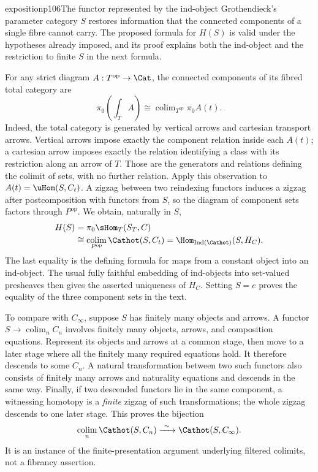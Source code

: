 \begin{dcomment}{exposition}{p106}{The functor represented by the ind-object}
Grothendieck's parameter category $S$ restores information that the connected components of a single fibre cannot carry. The proposed formula for $H(S)$ is valid under the hypotheses already imposed, and its proof explains both the ind-object and the restriction to finite $S$ in the next formula.

For any strict diagram $A:T^{\mathrm{op}}\to\Cat$, the connected components of its fibred total category are
\[
 \pi_0\left(\int_T A\right)
 \cong\mathop{\mathrm{colim}}_{T^{\mathrm{op}}}\pi_0 A(t).
\]
Indeed, the total category is generated by vertical arrows and cartesian transport arrows. Vertical arrows impose exactly the component relation inside each $A(t)$; a cartesian arrow imposes exactly the relation identifying a class with its restriction along an arrow of $T$. Those are the generators and relations defining the colimit of sets, with no further relation. Apply this observation to $A(t)=\uHom(S,C_t)$. A zigzag between two reindexing functors induces a zigzag after postcomposition with functors from $S$, so the diagram of component sets factors through $P^{\mathrm{op}}$. We obtain, naturally in $S$,
\[
 \begin{split}
 H(S)&=\pi_0\sHom_T(S_T,C)\\
 &\cong\mathop{\mathrm{colim}}_{P^{\mathrm{op}}}
       \Cathot(S,C_t)
 =\Hom_{\operatorname{Ind}(\Cathot)}(S,H_C).
 \end{split}
\]
The last equality is the defining formula for maps from a constant object into an ind-object. The usual fully faithful embedding of ind-objects into set-valued presheaves then gives the asserted uniqueness of $H_C$. Setting $S=e$ proves the equality of the three component sets in the text.

To compare with $C_\infty$, suppose $S$ has finitely many objects and arrows. A functor $S\to\mathop{\mathrm{colim}}_n C_n$ involves finitely many objects, arrows, and composition equations. Represent its objects and arrows at a common stage, then move to a later stage where all the finitely many required equations hold. It therefore descends to some $C_n$. A natural transformation between two such functors also consists of finitely many arrows and naturality equations and descends in the same way. Finally, if two descended functors lie in the same component, a witnessing homotopy is a \emph{finite} zigzag of such transformations; the whole zigzag descends to one later stage. This proves the bijection
\[
 \mathop{\mathrm{colim}}_n\Cathot(S,C_n)
 \xrightarrow{\ \sim\ }\Cathot(S,C_\infty).
\]
It is an instance of the finite-presentation argument underlying filtered colimits, not a fibrancy assertion.


\end{dcomment}

